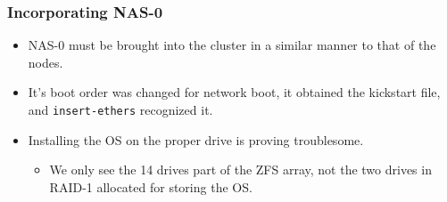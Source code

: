 \documentclass{beamer}
\begin{document}
\begin{frame}

  \frametitle{Incorporating NAS-0}

  \begin{itemize}
    \item NAS-0 must be brought into the cluster in a similar manner to that of
      the nodes.
    \item It's boot order was changed for network boot, it obtained the
      kickstart file, and {\tt insert-ethers} recognized it.
    \item Installing the OS on the proper drive is proving troublesome.
      \begin{itemize}
        \item We only see the 14 drives part of the ZFS array, not the two
          drives in RAID-1 allocated for storing the OS.
      \end{itemize}
  \end{itemize}

\end{frame}

\end{document}
